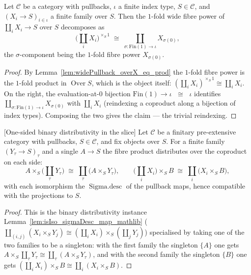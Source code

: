 \begin{lemma}

  \label{lem:coproduct_distrib_fibrePower_zero}
  Let \(\mathcal{C}\) be a category with pullbacks, \(\iota\) a finite index type, \(S \in
  \mathcal{C}\), and \((X_i \to S)_{i \in \iota}\) a finite family over \(S\). Then the \(1\)-fold
  wide fibre power of \(\coprod_i X_i \to S\) over \(S\) decomposes as
  \[
    \bigl(\textstyle\coprod_{i} X_i\bigr)^{\times_S 1}
      \;\cong\;
    \coprod_{\sigma : \mathrm{Fin}(1) \to \iota} X_{\sigma(0)},
  \]
  the \(\sigma\)-component being the \(1\)-fold fibre power \(X_{\sigma(0)}\).
\end{lemma}
\begin{proof}
  By Lemma~\ref{lem:widePullback_overX_eq_prod} the \(1\)-fold fibre power is the \(1\)-fold product
  in \(\operatorname{Over} S\), which is the object itself: \((\coprod_i X_i)^{\times_S 1} \cong
  \coprod_i X_i\). On the right, the evaluation-at-\(0\) bijection \(\mathrm{Fin}(1) \to \iota\)
  \(\;\cong\;\) \(\iota\) identifies \(\coprod_{\sigma : \mathrm{Fin}(1)\to\iota} X_{\sigma(0)}\)
  with \(\coprod_i X_i\) (reindexing a coproduct along a bijection of index types). Composing the
  two gives the claim --- the trivial reindexing.
\end{proof}

\begin{lemma}

[One-sided binary distributivity in the slice]
  \label{lem:prod_coproduct_distrib}
  Let \(\mathcal{C}\) be a finitary pre-extensive category with pullbacks, \(S \in \mathcal{C}\), and
  fix objects over \(S\). For a finite family \((Y_\tau \to S)_\tau\) and a single \(A \to S\) the
  fibre product distributes over the coproduct on each side:
  \[
    A \times_S \bigl(\textstyle\coprod_{\tau} Y_\tau\bigr)
      \;\cong\;
    \coprod_{\tau} \bigl(A \times_S Y_\tau\bigr),
    \qquad
    \bigl(\textstyle\coprod_{i} X_i\bigr) \times_S B
      \;\cong\;
    \coprod_{i} \bigl(X_i \times_S B\bigr),
  \]
  with each isomorphism the \(\operatorname{Sigma.desc}\) of the pullback maps, hence compatible with
  the projections to \(S\).
\end{lemma}
\begin{proof}
  This is the binary distributivity instance Lemma~\ref{lem:isIso_sigmaDesc_map_mathlib}
  (\(\coprod_{(i,j)}(X_i \times_S Y_j) \cong (\coprod_i X_i)\times_S(\coprod_j Y_j)\)) specialised by
  taking one of the two families to be a singleton: with the first family the singleton \(\{A\}\)
  one gets \(A \times_S \coprod_\tau Y_\tau \cong \coprod_\tau (A \times_S Y_\tau)\), and with the
  second family the singleton \(\{B\}\) one gets \((\coprod_i X_i)\times_S B \cong \coprod_i (X_i
  \times_S B)\).
\end{proof}

